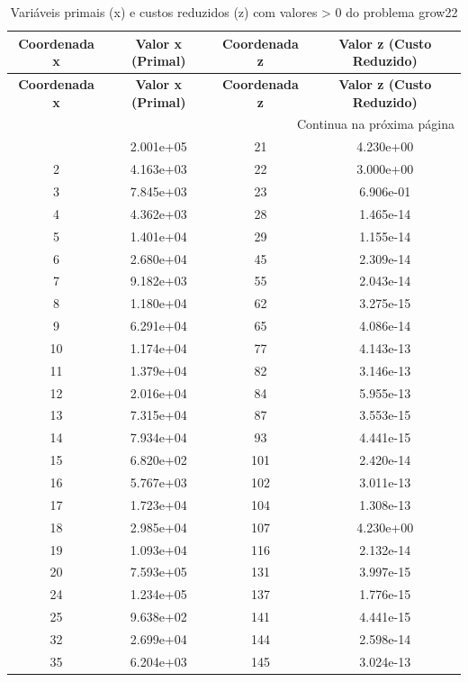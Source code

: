 \documentclass[12pt]{article}
\begin{document}
\begin{longtable}{@{}cccc@{}}
\caption{Variáveis primais (x) e custos reduzidos (z) com valores > 0 do problema grow22} \\
\toprule
\textbf{Coordenada x} & \textbf{Valor x (Primal)} & \textbf{Coordenada z} & \textbf{Valor z (Custo Reduzido)} \\
\midrule
\endfirsthead

\toprule
\textbf{Coordenada x} & \textbf{Valor x (Primal)} & \textbf{Coordenada z} & \textbf{Valor z (Custo Reduzido)} \\
\midrule
\endhead

\midrule \multicolumn{4}{r}{{Continua na próxima página}} \\ \midrule
\endfoot

\bottomrule
\endlastfoot
1 & 2.001e+05 & 21 & 4.230e+00 \\
2 & 4.163e+03 & 22 & 3.000e+00 \\
3 & 7.845e+03 & 23 & 6.906e-01 \\
4 & 4.362e+03 & 28 & 1.465e-14 \\
5 & 1.401e+04 & 29 & 1.155e-14 \\
6 & 2.680e+04 & 45 & 2.309e-14 \\
7 & 9.182e+03 & 55 & 2.043e-14 \\
8 & 1.180e+04 & 62 & 3.275e-15 \\
9 & 6.291e+04 & 65 & 4.086e-14 \\
10 & 1.174e+04 & 77 & 4.143e-13 \\
11 & 1.379e+04 & 82 & 3.146e-13 \\
12 & 2.016e+04 & 84 & 5.955e-13 \\
13 & 7.315e+04 & 87 & 3.553e-15 \\
14 & 7.934e+04 & 93 & 4.441e-15 \\
15 & 6.820e+02 & 101 & 2.420e-14 \\
16 & 5.767e+03 & 102 & 3.011e-13 \\
17 & 1.723e+04 & 104 & 1.308e-13 \\
18 & 2.985e+04 & 107 & 4.230e+00 \\
19 & 1.093e+04 & 116 & 2.132e-14 \\
20 & 7.593e+05 & 131 & 3.997e-15 \\
24 & 1.234e+05 & 137 & 1.776e-15 \\
25 & 9.638e+02 & 141 & 4.441e-15 \\
32 & 2.699e+04 & 144 & 2.598e-14 \\
35 & 6.204e+03 & 145 & 3.024e-13 \\

\end{longtable}
\end{document}
